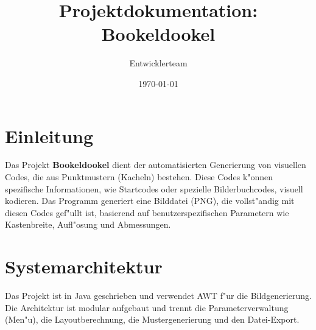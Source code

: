 \documentclass[a4paper,12pt]{article}
\title{Projektdokumentation: Bookeldookel}
\author{Entwicklerteam}
\date{\today}
\begin{document}
\maketitle
\tableofcontents
\newpage

\section{Einleitung}
Das Projekt \textbf{Bookeldookel} dient der automatisierten Generierung von visuellen Codes, die aus Punktmustern (Kacheln) bestehen. Diese Codes k"onnen spezifische Informationen, wie Startcodes oder spezielle Bilderbuchcodes, visuell kodieren. Das Programm generiert eine Bilddatei (PNG), die vollst"andig mit diesen Codes gef"ullt ist, basierend auf benutzerspezifischen Parametern wie Kastenbreite, Aufl"osung und Abmessungen.

\section{Systemarchitektur}
Das Projekt ist in Java geschrieben und verwendet AWT f"ur die Bildgenerierung. Die Architektur ist modular aufgebaut und trennt die Parameterverwaltung (Men"u), die Layoutberechnung, die Mustergenerierung und den Datei-Export.
\end{document}
